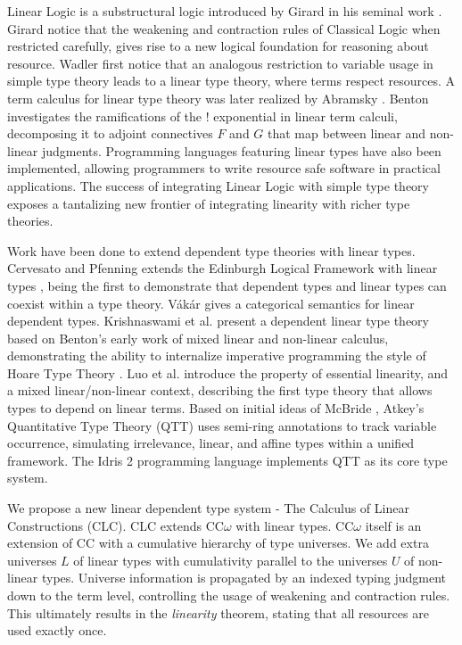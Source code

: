 \documentclass{article}
\theoremstyle{definition}
\begin{document}
  Linear Logic is a substructural logic introduced by Girard in his seminal work \cite{girard}. Girard notice that the weakening and contraction rules of Classical Logic when restricted carefully, gives rise to a new logical foundation for reasoning about resource. Wadler \cite{wadler1990,wadler1991} first notice that an analogous restriction to variable usage in simple type theory leads to a linear type theory, where terms respect resources. A term calculus for linear type theory was later realized by Abramsky \cite{abramsky1993}. Benton \cite{benton1994} investigates the ramifications of the ! exponential in linear term calculi, decomposing it to adjoint connectives $F$ and $G$ that map between linear and non-linear judgments. Programming languages \cite{l3,ats,linear-haskell} featuring linear types have also been implemented, allowing programmers to write resource safe software in practical applications. The success of integrating Linear Logic with simple type theory exposes a tantalizing new frontier of integrating linearity with richer type theories.

  Work have been done to extend dependent type theories with linear types. Cervesato and Pfenning extends the Edinburgh Logical Framework with linear types \cite{lf,llf}, being the first to demonstrate that dependent types and linear types can coexist within a type theory. V\'{a}k\'{a}r \cite{vakar14} gives a categorical semantics for linear dependent types.  Krishnaswami et al. present a dependent linear type theory \cite{neel15} based on Benton's early work of mixed linear and non-linear calculus, demonstrating the ability to internalize imperative programming the style of Hoare Type Theory \cite{htt}. Luo et al. introduce the property of essential linearity, and a mixed linear/non-linear context, describing the first type theory that allows types to depend on linear terms. Based on initial ideas of McBride \cite{nothing}, Atkey's Quantitative Type Theory (QTT) \cite{qtt} uses semi-ring annotations to track variable occurrence, simulating irrelevance, linear, and affine types within a unified framework. The Idris 2 programming language \cite{idris2} implements QTT as its core type system.

  We propose a new linear dependent type system - The Calculus of Linear Constructions (CLC). CLC extends CC$\omega$ with linear types. CC$\omega$ itself is an extension of CC with a cumulative hierarchy of type universes. We add extra universes $L$ of linear types with cumulativity parallel to the universes $U$ of non-linear types. Universe information is propagated by an indexed typing judgment down to the term level, controlling the usage of weakening and contraction rules. This ultimately results in the \textit{linearity} theorem, stating that all resources are used exactly once.
\end{document}
